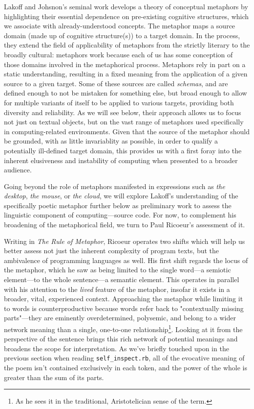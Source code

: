 \documentclass{article}
\begin{document}
Lakoff and Johsnon's seminal work develops a theory of conceptual metaphors by highlighting their essential dependence on pre-existing cognitive structures, which we associate with already-understood concepts. The metaphor maps a source domain (made up of cognitive structure(s)) to a target domain. In the process, they extend the field of applicability of metaphors from the strictly literary to the broadly cultural: metaphors work because each of us has some conception of those domains involved in the metaphorical process. Metaphors rely in part on a static understanding, resulting in a fixed meaning from the application of a given source to a given target. Some of these sources are called \emph{schemas}, and are defined enough to not be mistaken for something else, but broad enough to allow for multiple variants of itself to be applied to various targets\cite{lakoff_metaphors_1980}, providing both diversity and reliability. As we will see below, their approach allows us to focus not just on textual objects, but on the vast range of metaphors used specifically in computing-related environments. Given that the source of the metaphor should be grounded, with as little invariablity as possible, in order to qualify a potentially ill-defined target domain, this provides us with a first foray into the inherent elusiveness and instability of computing when presented to a broader audience.

Going beyond the role of metaphors manifested in expressions such as \emph{the desktop}, \emph{the mouse}, or \emph{the cloud}, we will explore Lakoff's understanding of the specifically poetic metaphor further below as preliminary work to assess the linguistic component of computing—source code. For now, to complement his broadening of the metaphorical field, we turn to Paul Ricoeur's assessment of it.

Writing in \emph{The Rule of Metaphor}, Ricoeur operates two shifts which will help us better assess not just the inherent complexity of program texts, but the ambivalence of programming languages as well. His first shift regards the locus of the metaphor, which he saw as being limited to the single word—a semiotic element—to the whole sentence—a semantic element\cite{ricoeur_rule_2003}. This operates in parallel with his attention to the \emph{lived} feature of the metaphor, insofar it exists in a broader, vital, experienced context. Approaching the metaphor while limiting it to words is counterproductive because words refer back to "contextually missing parts"—they are eminently overdetermined, polysemic, and belong to a wider network meaning than a single, one-to-one relationship\footnote{As he sees it in the traditional, Aristotelician sense of the term.}. Looking at it from the perspective of the sentence brings this rich network of potential meanings and broadens the scope for interpretation. As we've briefly touched upon in the previous section when reading \lstinline{self_inspect.rb}, all of the evocative meaning of the poem isn't contained exclusively in each token, and the power of the whole is greater than the sum of its parts.
\end{document}
